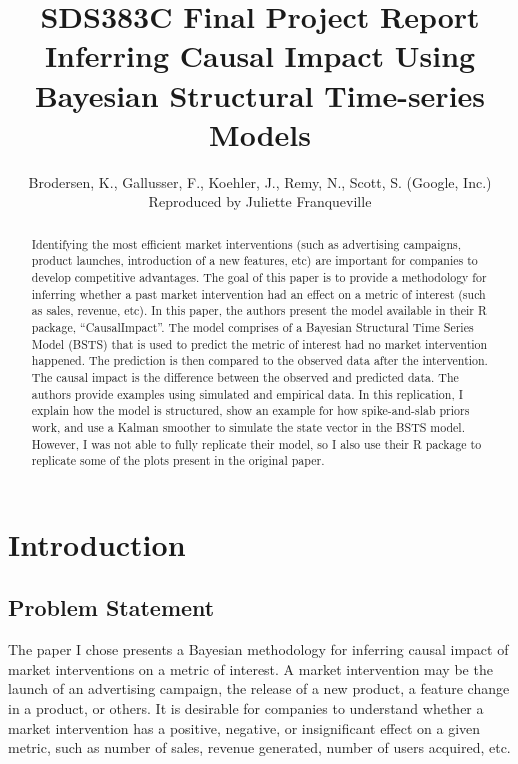 \documentclass[12pt]{article}
\begin{document}
 
\title{SDS383C Final Project Report \\ \textbf{Inferring Causal Impact Using Bayesian Structural Time-series Models}} 
\author{Brodersen, K., Gallusser, F., Koehler, J., Remy, N., Scott, S. (Google, Inc.)\\Reproduced by Juliette Franqueville
}
\maketitle
\newpage
\begin{abstract}
    Identifying the most efficient market interventions (such as advertising campaigns, product launches, introduction of a new features, etc) are important for companies to develop competitive advantages. The goal of this paper is to provide a methodology for inferring whether a past market intervention  had an effect on a metric of interest (such as sales, revenue, etc). In this paper, the authors present the model available in their R package, ``CausalImpact''. The model comprises of a Bayesian Structural Time Series Model (BSTS) that is used to predict the metric of interest had no market intervention happened. The prediction is then compared to the observed data after the intervention. The causal impact is the difference between the observed and predicted data. The authors provide examples using simulated and empirical data. In this replication, I explain how the model is structured, show an example for how spike-and-slab priors work, and use a Kalman smoother to simulate the state vector in the BSTS model. However, I was not able to fully replicate their model, so I also use their R package to replicate some of the plots present in the original paper.
\end{abstract}

\section{Introduction}
\subsection{Problem Statement}
The paper I chose  presents a Bayesian methodology for inferring causal impact of market interventions on a metric of interest. A market intervention may be the launch of an advertising campaign, the release of a new product, a feature change in a product, or others. It is desirable for companies to understand whether a market intervention has a positive, negative, or insignificant effect on a given metric, such as number of sales, revenue generated, number of users acquired, etc. \\
\end{document}
